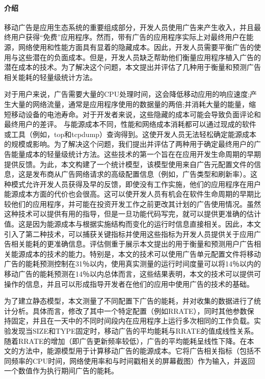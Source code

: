 \documentclass[a4paper]{article}
\begin{document}
\paragraph{介绍}
移动广告是应用生态系统的重要组成部分，开发人员使用广告来产生收入，并且最终用户获得“免费”应用程序。然而，带有广告的应用程序实际上对最终用户在能源，网络使用和性能方面具有显着的隐藏成本。因此，开发人员需要平衡广告的使用与这些潜在的负面成本。但是，开发人员缺乏帮助他们衡量应用程序植入广告的潜在成本的技术。为了解决这个问题，本文提出并评估了几种用于衡量和预测广告相关能耗的轻量级统计方法。

对于用户来说，广告需要大量的CPU处理时间，这会降低移动应用的响应速度;产生大量的网络流量，通常是应用程序使用的数据量的两倍;并消耗大量的能量，缩短移动设备的电池寿命。对于开发者来说，这些隐藏的成本可能会导致负面评论和最终用户的差评。
与能源成本不同，性能和网络成本消耗都可以通过现成的软件或工具（例如，top和tcpdump）查询得到。这使开发人员无法轻松确定能源成本的规模或影响。为了解决这个问题，我们提出并评估了两种用于确定最终用户的广告能量成本的轻量级统计方法。这些技术的第一个旨在在应用开发生命周期的早期提供反馈。为此，本文构建了一个统计模型，该模型使用来自广告元配置文件的信息，这是发布商从​​广告网络请求的高级配置信息（例如，广告类型和刷新率）。这种模式允许开发人员获得及早的反馈，即使没有工作实施，他们的应用程序在用户能源成本方面的代价也会很高。这可以使开发人员有机会在软件生命周期的早期比较他们的应用程序，并可能在投资开发工作之前更改其计划的广告使用情况。虽然这种技术可以提供有用的指导，但是一旦功能代码写完，就可以提供更准确的估计值。这是因为能源成本与根据实施结构而变化的运行时信息直接相关。因此，本文引入了第二种技术，可以捕获关键指标并使用这些指标为开发人员提供关于应用广告相关能耗的更准确信息。评估侧重于展示本文提出的用于衡量和预测用户广告相关能源成本的技术的能力。特别是，本文的技术可以使用广告单元配置文件将移动广告的能耗预测控制在31％以内，使用真实测量的运行时间度量可以将14％以内的移动广告的能耗预测在14％以内总体而言，这些结果表明，本文的技术可以提供可操作的信息，并且可以形成指导开发者在他们的应用中使用广告的技术的基础。

为了建立静态模型，本文测量了不同配置下广告的能耗，并对收集的数据进行了统计分析。具体而言，修改了其中一个特定配置（例如RRATE），同时其他参数保持固定，并且在一天中的不同时间段内在应用程序上运行多次相同的工作负载。实验发现当SIZE和TYPE固定时，移动广告的平均能耗与RRATE的值成线性关系。随着RRATE的增加（即广告更新频率较低），广告的平均能耗呈线性下降。在本文的方法中，能源模型用于计算移动广告的能源成本。它将广告相关指标（包括不同频率的CPU时间，网络使用率和与时间戳相关的屏幕截图）作为输入，并返回一个数值作为执行期间广告的能耗。
\end{document}
